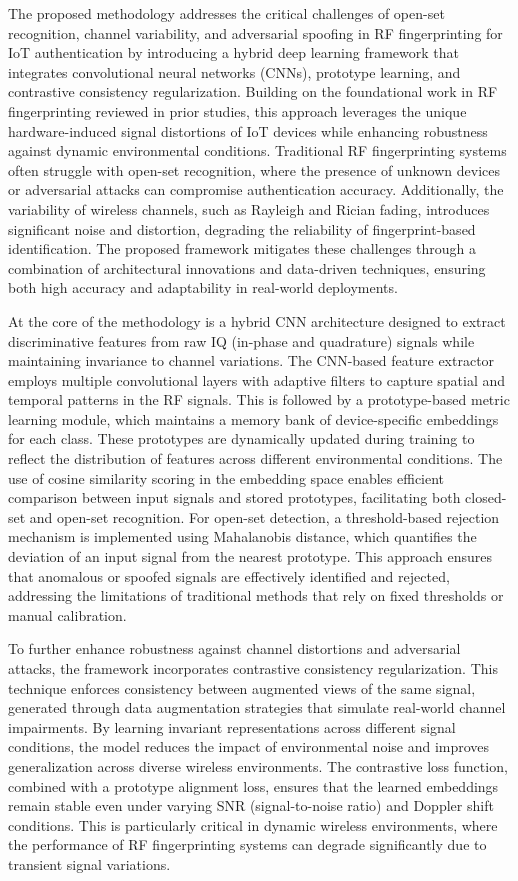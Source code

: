 \documentclass[conference]{IEEEtran}
\begin{document}
The proposed methodology addresses the critical challenges of open-set recognition, channel variability, and adversarial spoofing in RF fingerprinting for IoT authentication by introducing a hybrid deep learning framework that integrates convolutional neural networks (CNNs), prototype learning, and contrastive consistency regularization. Building on the foundational work in RF fingerprinting reviewed in prior studies, this approach leverages the unique hardware-induced signal distortions of IoT devices while enhancing robustness against dynamic environmental conditions. Traditional RF fingerprinting systems often struggle with open-set recognition, where the presence of unknown devices or adversarial attacks can compromise authentication accuracy. Additionally, the variability of wireless channels, such as Rayleigh and Rician fading, introduces significant noise and distortion, degrading the reliability of fingerprint-based identification. The proposed framework mitigates these challenges through a combination of architectural innovations and data-driven techniques, ensuring both high accuracy and adaptability in real-world deployments.

At the core of the methodology is a hybrid CNN architecture designed to extract discriminative features from raw IQ (in-phase and quadrature) signals while maintaining invariance to channel variations. The CNN-based feature extractor employs multiple convolutional layers with adaptive filters to capture spatial and temporal patterns in the RF signals. This is followed by a prototype-based metric learning module, which maintains a memory bank of device-specific embeddings for each class. These prototypes are dynamically updated during training to reflect the distribution of features across different environmental conditions. The use of cosine similarity scoring in the embedding space enables efficient comparison between input signals and stored prototypes, facilitating both closed-set and open-set recognition. For open-set detection, a threshold-based rejection mechanism is implemented using Mahalanobis distance, which quantifies the deviation of an input signal from the nearest prototype. This approach ensures that anomalous or spoofed signals are effectively identified and rejected, addressing the limitations of traditional methods that rely on fixed thresholds or manual calibration.

To further enhance robustness against channel distortions and adversarial attacks, the framework incorporates contrastive consistency regularization. This technique enforces consistency between augmented views of the same signal, generated through data augmentation strategies that simulate real-world channel impairments. By learning invariant representations across different signal conditions, the model reduces the impact of environmental noise and improves generalization across diverse wireless environments. The contrastive loss function, combined with a prototype alignment loss, ensures that the learned embeddings remain stable even under varying SNR (signal-to-noise ratio) and Doppler shift conditions. This is particularly critical in dynamic wireless environments, where the performance of RF fingerprinting systems can degrade significantly due to transient signal variations.
\end{document}
